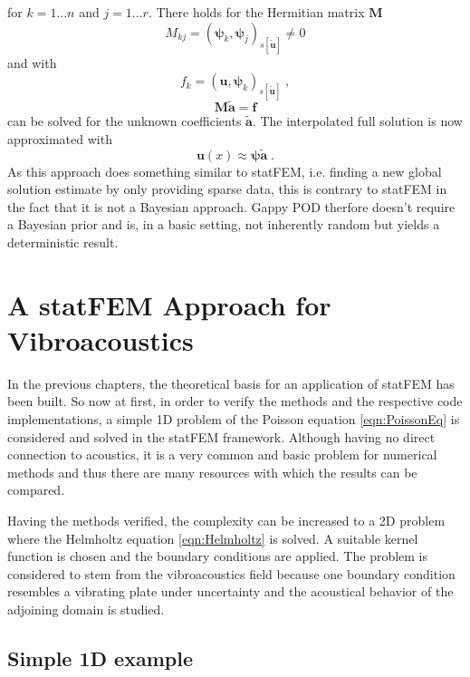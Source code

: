 \documentclass[%
  a4paper,oneside,%
  11pt,%
  smallchapters,
  style=printdev,
  extramargin,
  green,%
  rgb, <cmyk>
  ]{tubsbook}
\begin{document}
for $k=1...n$ and $j=1...r$.
There holds for the Hermitian matrix $\bm{M}$
\begin{equation}
M_{kj} = (\bm{\psi}_k, \bm{\psi}_j )_{s[\tilde{\bm{u}}]} \neq 0
\end{equation}
and with
\begin{equation}
f_k=(\bm{u}, \bm{\psi}_k)_{s[\tilde{\bm{u}}]} \;,
\end{equation}
\begin{equation}
\bm{M}\tilde{\bm{a}} = \bm{f}
\end{equation}
can be solved for the unknown coefficients $\tilde{\bm{a}}$.
The interpolated full solution is now approximated with
\begin{equation}
\bm{u}(x) \approx \bm{\psi} \tilde{\bm{a}} \;.
\end{equation}
As this approach does something similar to statFEM, i.e. finding a new global solution estimate by only providing sparse data, this is contrary to statFEM in the fact that it is not a Bayesian approach. Gappy POD therfore doesn't require a Bayesian prior and is, in a basic setting, not inherently random but yields a deterministic result.




\chapter{A statFEM Approach for Vibroacoustics}
In the previous chapters, the theoretical basis for an application of statFEM has been built. So now at first, in order to verify the methods and the respective code implementations, a simple 1D problem of the Poisson equation \eqref{eqn:PoissonEq} is considered and solved in the statFEM framework. Although having no direct connection to acoustics, it is a very common and  basic problem for numerical methods and thus there are many resources \cite{girolami2021,langtangen2019} with which the results can be compared.

Having the methods verified, the complexity can be increased to a 2D problem where the Helmholtz equation \eqref{eqn:Helmholtz} is solved. A suitable kernel function is chosen and the boundary conditions are applied. The problem is considered to stem from the vibroacoustics field because one boundary condition resembles a vibrating plate under uncertainty and the acoustical behavior of the adjoining domain is studied.

\section{Simple 1D example}
\end{document}
